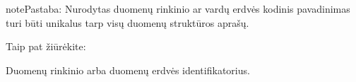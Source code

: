 \documentclass[letterpaper,10pt,lithuanian]{sphinxmanual}
\begin{document}
\begin{sphinxadmonition}{note}{Pastaba:}
\sphinxAtStartPar
Nurodytas duomenų rinkinio ar vardų erdvės kodinis pavadinimas turi būti
unikalus tarp visų duomenų struktūros aprašų.
\end{sphinxadmonition}


\begin{sphinxseealso}{Taip pat žiūrėkite:}

\begin{DUlineblock}{0em}
\item[] {\hyperref[\detokenize{vardu-erdves:ns}]{}}
\item[] {\hyperref[\detokenize{pavadinimai:kodiniai-pavadinimai}]{}}
\end{DUlineblock}


\end{sphinxseealso}


\begin{fulllineitems}
\label{\detokenize{dimensijos:dataset.id}}
\pysigstartsignatures
\pysigline
{}
\pysigstopsignatures
\sphinxAtStartPar
Duomenų rinkinio arba duomenų erdvės identifikatorius.

\end{fulllineitems}

\end{document}
